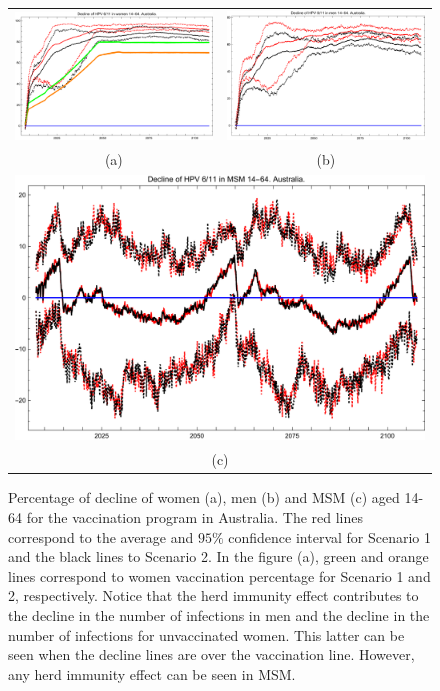 \begin{figure}[!]
	\centering
	\begin{tabular}{cc}
		\includegraphics[width=0.5\linewidth]{IMGs/3.-Australia/Decl_muj_14_64_verr_Australia.pdf}	& 
		\includegraphics[width=0.5\linewidth]{IMGs/3.-Australia/Decl_hom_14_64_verr_Australia.pdf}  \\ 
		(a)	& (b) \\ 
		\multicolumn{2}{c}{ \includegraphics[width=0.5\linewidth]{IMGs/3.-Australia/Decl_MSM_14_64_verr_Australia.pdf} } \\ 
		\multicolumn{2}{c}{(c)} \\ 
	\end{tabular} 
	\caption{Percentage of decline of women (a), men (b) and MSM (c) aged 14-64 for the vaccination program in Australia. The red lines correspond to the average and $95\%$ confidence interval for Scenario 1 and the black lines to Scenario 2. In the figure (a), green and orange lines correspond to women vaccination percentage for Scenario 1 and 2, respectively. Notice that the herd immunity effect contributes to the decline in the number of infections in men and the decline in the number of infections for unvaccinated women. This latter can be seen when the decline lines are over the vaccination line. However, any herd immunity effect can be seen in MSM.}
	\label{fig:decline_AUS_6_11_14_64}
\end{figure}

